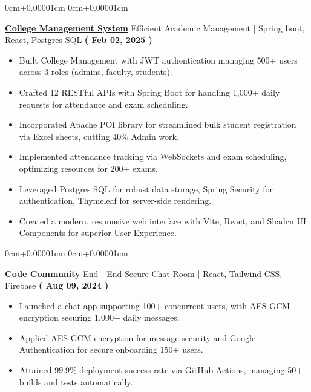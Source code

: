 \documentclass[10pt,a4paper]{article}
\newenvironment{highlights}{
    \begin{itemize}[
        topsep=0.10cm,
        parsep=0.10cm,
        partopsep=0pt,
        itemsep=0pt,
        leftmargin=0cm+10pt
    ]
    }{
    \end{itemize}
}
\newenvironment{onecolentry}{
    \begin{adjustwidth}{
        0cm+0.00001cm
    }{
        0cm+0.00001cm
    }
    }{
    \end{adjustwidth}
}
\begin{document}
    \begin{onecolentry}
        \textbf{\href{https://github.com/Jefino9488/College-Management-Server}{College Management System}} Efficient Academic Management | Spring boot, React, Postgres SQL \hfill \textbf{( Feb 02, 2025 )} \\
        \begin{highlights}
            \item Built College Management with JWT authentication  managing 500+ users across 3 roles (admins, faculty, students). \\
            \item Crafted 12 RESTful APIs with Spring Boot for handling 1,000+ daily requests for attendance and exam scheduling. \\
            \item Incorporated Apache POI library for streamlined bulk student registration via Excel sheets, cutting 40\% Admin work. \\
            \item Implemented attendance tracking via WebSockets and exam scheduling, optimizing resources for 200+ exams. \\
            \item Leveraged Postgres SQL for robust data storage, Spring Security for authentication, Thymeleaf for server-side rendering. \\
            \item Created a modern, responsive web interface with Vite, React, and Shadcn UI Components for superior User Experience. \\
        \end{highlights}
    \end{onecolentry}
    \vspace{0.01cm}
    \begin{onecolentry}
        \textbf{\href{https://github.com/Jefino9488/Code_Community}{Code Community}} End - End Secure Chat Room | React, Tailwind CSS, Firebase \hfill \textbf{( Aug 09, 2024 )} \\
        \begin{highlights}
            \item Launched a chat app supporting 100+ concurrent users, with AES-GCM encryption securing 1,000+ daily messages. \\
            \item Applied AES-GCM encryption for message security and Google Authentication for secure onboarding 150+ users. \\
            \item Attained 99.9\% deployment success rate via GitHub Actions, managing 50+ builds and tests automatically.
        \end{highlights}
    \end{onecolentry}
\end{document}
